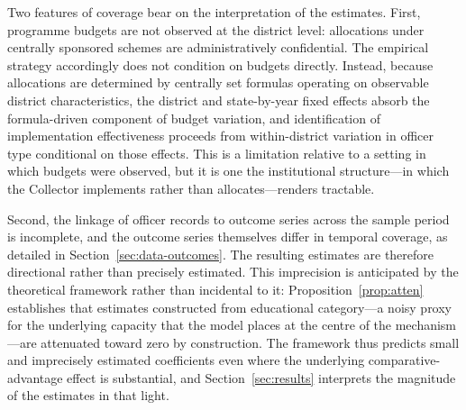Two features of coverage bear on the interpretation of the estimates. First,
programme budgets are not observed at the district level: allocations under
centrally sponsored schemes are administratively confidential. The empirical
strategy accordingly does not condition on budgets directly. Instead, because
allocations are determined by centrally set formulas operating on observable
district characteristics, the district and state-by-year fixed effects absorb the
formula-driven component of budget variation, and identification of implementation
effectiveness proceeds from within-district variation in officer type conditional on
those effects. This is a limitation relative to a setting in which budgets were
observed, but it is one the institutional structure---in which the Collector
implements rather than allocates---renders tractable.

Second, the linkage of officer records to outcome series across the sample period is
incomplete, and the outcome series themselves differ in temporal coverage, as
detailed in Section~\ref{sec:data-outcomes}. The resulting estimates are therefore
directional rather than precisely estimated. This imprecision is anticipated by the
theoretical framework rather than incidental to it: Proposition~\ref{prop:atten}
establishes that estimates constructed from educational category---a noisy proxy for
the underlying capacity that the model places at the centre of the mechanism---are
attenuated toward zero by construction. The framework thus predicts small and
imprecisely estimated coefficients even where the underlying comparative-advantage
effect is substantial, and Section~\ref{sec:results} interprets the magnitude of the
estimates in that light.

